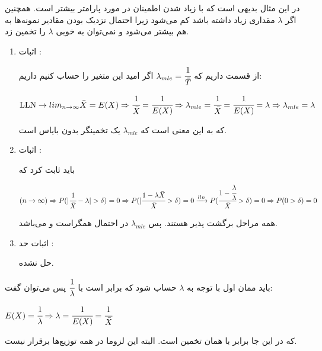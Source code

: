 \documentclass[12pt]{article}
\begin{document}
در این مثال بدیهی است که با زیاد شدن 
اطمینان در مورد پارامتر بیشتر است. همچنین اگر 
$\lambda$
مقداری زیاد داشته باشد 
کم می‌شود زیرا احتمال نزدیک بودن مقادیر نمونه‌ها به هم بیشتر می‌شود و نمی‌توان به خوبی 
$\lambda$
را تخمین زد.
\begin{enumerate}
	\item 
	اثبات 
	:
	
	از قسمت 
	داریم که 
	$\lambda_{mle} = \cfrac{1}{\bar{T}}
	$
	اگر امید این متغیر را حساب کنیم داریم:
	\begin{latin}
		$
		\text{LLN} \rightarrow lim _{n \rightarrow \infty } \bar{X} = E(X)  \Rightarrow \cfrac{1}{\bar{X}} = \cfrac{1}{E(X) } \Rightarrow
		\lambda_{mle} = \cfrac{1}{\bar{X}} = \cfrac{1}{E(X)} = \lambda \Rightarrow \lambda_{mle} = \lambda
		$
	\end{latin}
	که به این معنی است که 
	$\lambda_{mle}$
	یک تخمینگر بدون بایاس است.
	\item 
	اثبات 
	:
	
	باید ثابت کرد که 
	
	\begin{latin}
		$
	(n \rightarrow\infty) \Rightarrow	P(|\cfrac{1}{\bar{X}} - \lambda| > \delta) = 0  \Rightarrow P(|\cfrac{1 - \lambda \bar{X}}{\bar{X}} > \delta) = 0
	\xrightarrow{lln} P(\cfrac{1 - \cfrac{\lambda}{\lambda}}{\bar{X}} > \delta) = 0 \Rightarrow P(0 > \delta) = 0
		$
	\end{latin}
	همه مراحل برگشت پذیر هستند. پس 
	$\lambda_{mle}$
	در احتمال همگراست و 
	می‌باشد.
	
	
	\item 
	اثبات حد 
	:
	
	حل نشده.
	
\end{enumerate}
باید ممان اول با توجه به 
$\lambda$
حساب شود که برابر است با 
$\cfrac{1}{\lambda}$
پس می‌توان گفت:

\begin{latin}
	$
	E(X) = \cfrac{1}{\lambda} \Rightarrow \lambda = \cfrac{1}{E(X)} = \cfrac{1}{\bar{X}}
	$
\end{latin}
که در این جا برابر با همان تخمین 
است. البته این لزوما در همه توزیع‌ها برقرار نیست.
\end{document}
